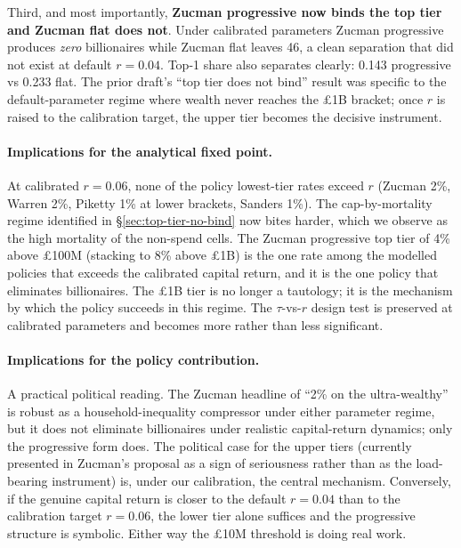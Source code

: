 \documentclass[11pt]{article}
\begin{document}
Third, and most importantly,
\textbf{Zucman progressive now binds the top tier and Zucman flat
does not}. Under calibrated parameters Zucman progressive produces
\emph{zero} billionaires while Zucman flat leaves 46, a clean
separation that did not exist at default $r=0.04$. Top-1 share
also separates clearly: 0.143 progressive vs 0.233 flat. The
prior draft's ``top tier does not bind'' result was specific to
the default-parameter regime where wealth never reaches the
\pounds1B bracket; once $r$ is raised to the calibration target, the
upper tier becomes the decisive instrument.

\paragraph{Implications for the analytical fixed point.} At
calibrated $r = 0.06$, none of the policy lowest-tier rates exceed
$r$ (Zucman 2\%, Warren 2\%, Piketty 1\% at lower brackets, Sanders
1\%). The cap-by-mortality regime identified in
\S\ref{sec:top-tier-no-bind} now bites harder, which we observe as
the high mortality of the non-spend cells. The Zucman progressive
top tier of 4\% above \pounds100M (stacking to 8\% above \pounds1B)
is the one rate among the modelled policies that exceeds the
calibrated capital return, and it is the one policy that eliminates
billionaires. The \pounds1B tier is no longer a tautology; it is the
mechanism by which the policy succeeds in this regime. The
$\tau$-vs-$r$ design test is preserved at calibrated parameters
and becomes more rather than less significant.

\paragraph{Implications for the policy contribution.} A practical
political reading. The Zucman headline of ``2\% on the
ultra-wealthy'' is robust as a household-inequality compressor
under either parameter regime, but it does not eliminate
billionaires under realistic capital-return dynamics; only the
progressive form does. The political case for the upper tiers
(currently presented in Zucman's proposal as a sign of seriousness
rather than as the load-bearing instrument) is, under our
calibration, the central mechanism. Conversely, if the genuine
capital return is closer to the default $r=0.04$ than to the
calibration target $r=0.06$, the lower tier alone suffices and the
progressive structure is symbolic. Either way the \pounds10M
threshold is doing real work.
\end{document}
